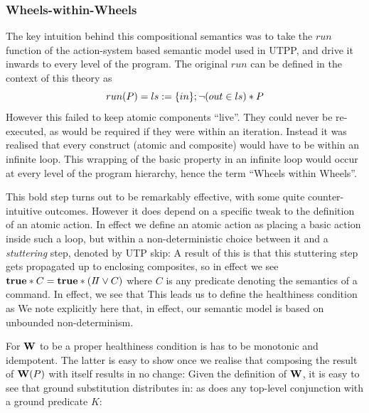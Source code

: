 \subsubsection{Wheels-within-Wheels}\label{sssec:WwW}

The key intuition behind this compositional semantics was to take the
$run$ function of the action-system based semantic model used in UTPP,
and drive it inwards to every level of the program.
The original $run$ can be defined in the context of this theory as
\[
  run(P) = ls := \{in\} ; \lnot (out \in ls) * P
\]
However this failed to keep atomic components ``live''.
They could never be re-executed,
as would be required if they were within an iteration.
Instead it was realised that every construct (atomic and composite)
would have to be within an infinite loop.%
%
This wrapping of the basic property in an infinite loop
would occur at every level of the program hierarchy,
hence the term ``Wheels within Wheels''.

This bold step turns out to be remarkably effective,
with some quite counter-intuitive outcomes.
However it does depend on a specific tweak to the
definition of an atomic action.
In effect we define an atomic action
as placing a basic action inside such a loop,
but within a non-deterministic choice between it
and a \emph{stuttering} step, denoted by UTP skip:
A result of this is that this stuttering step gets
propagated up to enclosing composites,
so in effect we see $\mathbf{true} * C = \mathbf{true} * (I\!I\lor C)$
where $C$ is any predicate denoting the semantics of a command.
In effect,
we  see that
This leads us to define the healthiness condition as
%
We note explicitly here that, in effect,
our semantic model is based on unbounded non-determinism.

For $\mathbf{W}$ to be a proper healthiness condition
is has to be monotonic and idempotent.
The latter is easy to show once we realise that composing the result
of $\mathbf{W}(P)$ with itself results in no change:
Given the definition of $\mathbf{W}$, it is easy to see that ground
substitution distributes in:
as does any top-level conjunction with a ground predicate $K$:



